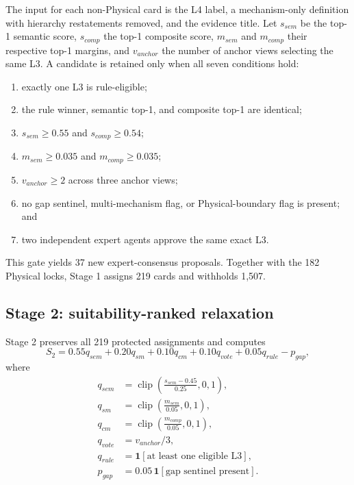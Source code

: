 \documentclass[11pt,a4paper]{article}
\begin{document}
The input for each non-Physical card is the L4 label, a mechanism-only
definition with hierarchy restatements removed, and the evidence title. Let
$s_{sem}$ be the top-1 semantic score, $s_{comp}$ the top-1 composite score,
$m_{sem}$ and $m_{comp}$ their respective top-1 margins, and $v_{anchor}$ the
number of anchor views selecting the same L3. A candidate is retained only when
all seven conditions hold:

\begin{enumerate}[leftmargin=2em]
  \item exactly one L3 is rule-eligible;
  \item the rule winner, semantic top-1, and composite top-1 are identical;
  \item $s_{sem}\geq0.55$ and $s_{comp}\geq0.54$;
  \item $m_{sem}\geq0.035$ and $m_{comp}\geq0.035$;
  \item $v_{anchor}\geq2$ across three anchor views;
  \item no gap sentinel, multi-mechanism flag, or Physical-boundary flag is present; and
  \item two independent expert agents approve the same exact L3.
\end{enumerate}

This gate yields 37 new expert-consensus proposals. Together with the 182
Physical locks, Stage 1 assigns 219 cards and withholds 1,507.

\subsection{Stage 2: suitability-ranked relaxation}

Stage 2 preserves all 219 protected assignments and computes
\begin{equation}
S_2=0.55q_{sem}+0.20q_{sm}+0.10q_{cm}+0.10q_{vote}+0.05q_{rule}-p_{gap},
\end{equation}
where
\begin{align}
q_{sem}&=\operatorname{clip}\left(\frac{s_{sem}-0.45}{0.25},0,1\right),\\
q_{sm}&=\operatorname{clip}\left(\frac{m_{sem}}{0.05},0,1\right),\\
q_{cm}&=\operatorname{clip}\left(\frac{m_{comp}}{0.05},0,1\right),\\
q_{vote}&=v_{anchor}/3,\\
q_{rule}&=\mathbf{1}[\text{at least one eligible L3}],\\
p_{gap}&=0.05\,\mathbf{1}[\text{gap sentinel present}].
\end{align}
\end{document}
